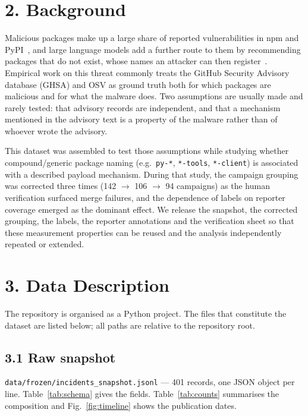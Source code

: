 \documentclass[preprint,12pt]{elsarticle}
\begin{document}
\section*{2. Background}

Malicious packages make up a large share of reported vulnerabilities in npm and PyPI~\cite{akhavani2025}, and large language models add a further route to them by recommending packages that do not exist, whose names an attacker can then register~\cite{spracklen2025,huang2026}. Empirical work on this threat commonly treats the GitHub Security Advisory database (GHSA) and OSV as ground truth both for which packages are malicious and for what the malware does. Two assumptions are usually made and rarely tested: that advisory records are independent, and that a mechanism mentioned in the advisory text is a property of the malware rather than of whoever wrote the advisory.

This dataset was assembled to test those assumptions while studying whether compound/generic package naming (e.g.\ \texttt{py-*}, \texttt{*-tools}, \texttt{*-client}) is associated with a described payload mechanism. During that study, the campaign grouping was corrected three times (142 $\rightarrow$ 106 $\rightarrow$ 94 campaigns) as the human verification surfaced merge failures, and the dependence of labels on reporter coverage emerged as the dominant effect. We release the snapshot, the corrected grouping, the labels, the reporter annotations and the verification sheet so that these measurement properties can be reused and the analysis independently repeated or extended.

\section*{3. Data Description}

The repository is organised as a Python project. The files that constitute the dataset are listed below; all paths are relative to the repository root.

\subsection*{3.1 Raw snapshot}

\texttt{data/frozen/incidents\_snapshot.jsonl} --- 401 records, one JSON object per line. Table~\ref{tab:schema} gives the fields. Table~\ref{tab:counts} summarises the composition and Fig.~\ref{fig:timeline} shows the publication dates.
\end{document}
